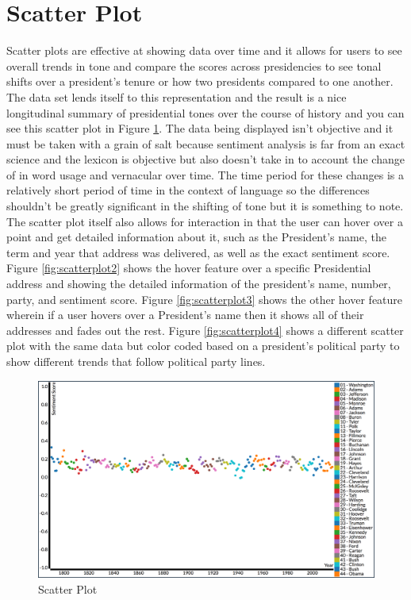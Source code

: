 \section{Scatter Plot}
Scatter plots are effective at showing data over time and it allows for users to see overall trends in tone and compare the scores across presidencies to see tonal shifts over a president's tenure or how two presidents compared to one another.
The data set lends itself to this representation and the result is a nice longitudinal summary of presidential tones over the course of history and you can see this scatter plot in Figure \ref{fig:scatterplot1}.
The data being displayed isn't objective and it must be taken with a grain of salt because sentiment analysis is far from an exact science and the lexicon is objective but also doesn't take in to account the change of in word usage and vernacular over time.
The time period for these changes is a relatively short period of time in the context of language so the differences shouldn't be greatly significant in the shifting of tone but it is something to note.
The scatter plot itself also allows for interaction in that the user can hover over a point and get detailed information about it, such as the President's name, the term and year that address was delivered, as well as the exact sentiment score.
Figure \ref{fig:scatterplot2} shows the hover feature over a specific Presidential address and showing the detailed information of the president's name, number, party, and sentiment score.
Figure \ref{fig:scatterplot3} shows the other hover feature wherein if a user hovers over a President's name then it shows all of their addresses and fades out the rest.
Figure \ref{fig:scatterplot4} shows a different scatter plot with the same data but color coded based on a president's political party to show different trends that follow political party lines.

\begin{figure}
  \includegraphics[width=\columnwidth]{images/scatter_plot.png}
  \caption{Scatter Plot}
  \label{fig:scatterplot1}
\end{figure}

